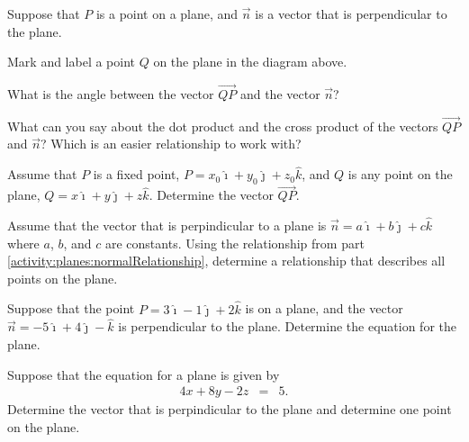 \begin{problem}
\item Suppose that $P$ is a point on a plane, and $\vec{n}$ is a vector that is perpendicular to the plane.


  \begin{subproblem}
    \item Mark and label a point $Q$ on the plane in the diagram above.
    \item What is the angle between the vector $\overrightarrow{QP}$ and the vector $\vec{n}$?
      \vspace{3em}
    \item What can you say about the dot product and the cross product of the vectors $\overrightarrow{QP}$ and $\vec{n}$? Which is an easier relationship to work with?
      \label{activity:planes:normalRelationship}
      \vfill

      \clearpage

    \item Assume that $P$ is a fixed point, $P=x_0\hat{\imath}+y_0\hat{\jmath}+z_0\hat{k}$, and $Q$ is any point on the plane, $Q=x\hat{\imath}+y\hat{\jmath}+z\hat{k}$.
      Determine the vector $\overrightarrow{QP}$.
        \vfill
    \item Assume that the vector that is perpindicular to a plane is $\vec{n}=a\hat{\imath}+b\hat{\jmath}+c\hat{k}$ where $a$, $b$, and $c$ are constants.
       Using the relationship from part \ref{activity:planes:normalRelationship}, determine a relationship that describes all points on the plane.
      \vfill
      \clearpage
    \item Suppose that the point $P=3\hat{\imath}-1\hat{\jmath}+2\hat{k}$ is on a plane, and the vector $\vec{n}=-5\hat{\imath}+4\hat{\jmath}-\hat{k}$ is perpendicular to the plane.
       Determine the equation for the plane.
       \vfill
    \item Suppose that the equation for a plane is given by
    \begin{eqnarray*}
      4x + 8y - 2z & = & 5.
    \end{eqnarray*}
    Determine the vector that is perpindicular to the plane and determine one point on the plane.
       \vfill


\end{subproblem}
\end{problem}

